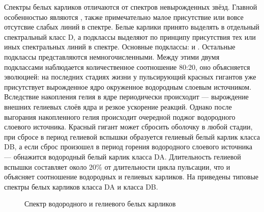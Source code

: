Спектры белых карликов отличаются от спектров невырожденных звёзд. Главной особенностью являются , также примечательно малое присутствие или вовсе отсутсвие слабых линий в спектре. Белые карлики принято выделять в отдельный спектральный класс D, а подклассы выделяют по принципу присутствия тех или иных спектральных линий в спектре. Основные подклассы:  и . Остальные подклассы представляются немногочисленными. Между этими двумя подклассами наблюдается количественное соотношение 80:20, оно объясняется эволюцией: на последних стадиях жизни у пульсирующий красных гигантов уже присутствует вырожденное ядро окруженное водородным слоевым источником. Вследствие накопления гелия в ядре периодически происходит  — вырождение внешних гелиевых слоёв ядра и резкое ускорение реакций. Однако после выгорания накопленного гелия происходит очередной поджог водородного слоевого источника. Красный гигант может сбросить оболочку в любой стадии, при сбросе в период гелиевой вспышки образуется гелиевый белый карлик класса DB, а если сброс произошел в период горения водородного слоевого источника — обнажится водородный белый карлик класса DA. Длительность гелиевой вспышки составляет около 20\% от длительности цикла пульсации, что и объясняет соотношение водородных и гелиевых карликов. На  приведены типовые спектры белых карликов класса DA и класса DB.


\begin{figure}[h!]
    \centering
    \caption{Спектр водородного и гелиевого белых карликов}
    \label{pic:spectrum-wd}
\end{figure}

